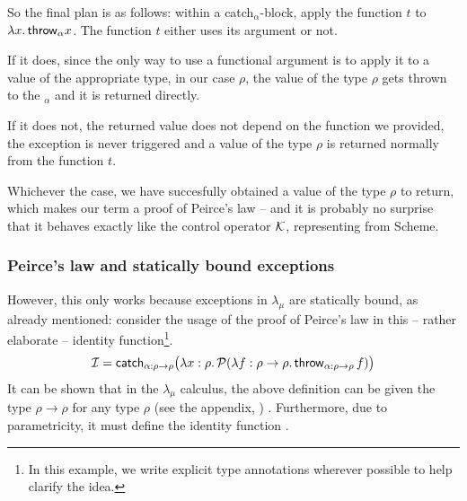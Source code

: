 So the final plan is as follows: within a catch$_\alpha$-block, apply the function $t$ to
$\lambda x.\, \mathsf{throw}_\alpha x$. The function $t$ either uses its argument or not.

If it does, since
the only way to use a functional argument is to apply it to a value of the
appropriate type, in our case $\rho$, the value of the type $\rho$ gets thrown to the
$_\alpha$ and it is returned directly.

If it does not, the returned value does not depend on the function we provided, the
exception is never triggered and a value of the type $\rho$ is returned normally from
the function $t$.

Whichever the case, we have succesfully obtained a value of the type $\rho$ to return, which
makes our term a proof of Peirce's law -- and it is probably no surprise that it behaves
exactly like the control operator $\mathcal{K}$, representing  from Scheme.

\subsubsection{Peirce's law and statically bound exceptions}

However, this only works because exceptions in $\lambda_\mu$ are statically bound,
as already mentioned:
consider the usage of the proof of Peirce's law in this -- rather elaborate --
identity function\footnote{In this example, we write
explicit type annotations wherever possible to help clarify the idea.}.
\[ \mathcal{I} = \mathsf{catch}_{\alpha : \rho \to \rho} \big(
	  \lambda x : \rho.\, \mathcal{P}(\lambda f : \rho \to \rho.\, \mathsf{throw}_{\alpha: \rho\to\rho} \, f)
   \big)
\]
It can be shown that in the $\lambda_\mu$ calculus, the above definition can be given
the type $\rho \to \rho$ for any type $\rho$ (see the appendix, )
\label{sec:peirce-law-dynamic}. Furthermore, due to parametricity, it must define the identity
function \cite{wadler89}.

